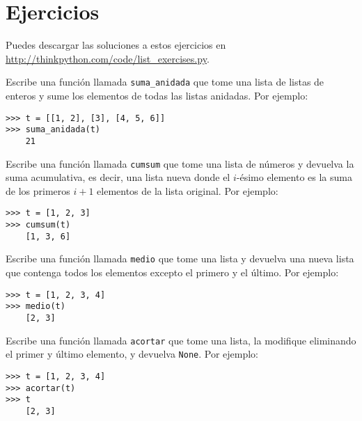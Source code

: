 \documentclass[10pt]{book}
\begin{document}
\section{Ejercicios}

Puedes descargar las soluciones a estos ejercicios en
\url{http://thinkpython.com/code/list_exercises.py}.

\begin{exercise}

Escribe una función llamada \verb"suma_anidada" que tome una lista de listas
de enteros y sume los elementos de todas las listas anidadas.
Por ejemplo:

\begin{verbatim}
>>> t = [[1, 2], [3], [4, 5, 6]]
>>> suma_anidada(t)
    21
\end{verbatim}

\end{exercise}

\begin{exercise}
\label{cumulative}

Escribe una función llamada {\tt cumsum} que tome una lista de números y
devuelva la suma acumulativa, es decir, una lista nueva donde el $i$-ésimo
elemento es la suma de los primeros $i+1$ elementos de la lista original.
Por ejemplo:

\begin{verbatim}
>>> t = [1, 2, 3]
>>> cumsum(t)
    [1, 3, 6]
\end{verbatim}

\end{exercise}

\begin{exercise}

Escribe una función llamada \verb"medio" que tome una lista y
devuelva una nueva lista que contenga todos los elementos excepto el primero
y el último.  Por ejemplo:

\begin{verbatim}
>>> t = [1, 2, 3, 4]
>>> medio(t)
    [2, 3]
\end{verbatim}

\end{exercise}

\begin{exercise}

Escribe una función llamada \verb"acortar" que tome una lista, la modifique
eliminando el primer y último elemento, y devuelva {\tt None}.
Por ejemplo:

\begin{verbatim}
>>> t = [1, 2, 3, 4]
>>> acortar(t)
>>> t
    [2, 3]
\end{verbatim}

\end{exercise}
\end{document}
